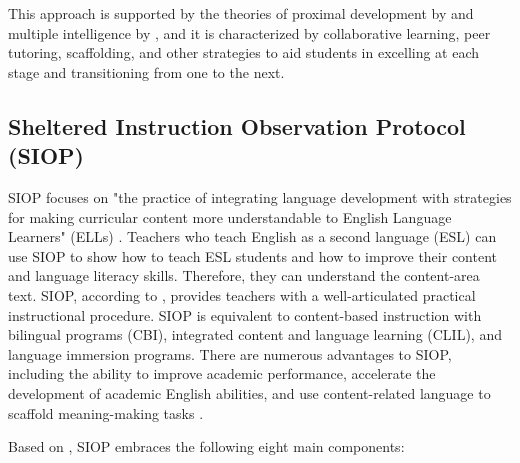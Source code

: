 \documentclass[english]{textolivre}
\begin{document}
This approach is supported by the theories of proximal development by \textcite{vygotskii_mind_1978} and multiple intelligence by \textcite{gardner_educational_1989}, and it is characterized by collaborative learning, peer tutoring, scaffolding, and other strategies to aid students in excelling at each stage and transitioning from one to the next.

\subsection{Sheltered Instruction Observation Protocol (SIOP)}\label{sec-conduta}
SIOP focuses on "the practice of integrating language development with strategies for making curricular content more understandable to English Language Learners" (ELLs) \cite[p. 334]{short_developing_2012}. Teachers who teach English as a second language (ESL) can use SIOP to show how to teach ESL students and how to improve their content and language literacy skills. Therefore, they can understand the content-area text. SIOP, according to \textcite{echevarria_using_2011}, provides teachers with a well-articulated practical instructional procedure. SIOP is equivalent to content-based instruction with bilingual programs (CBI), integrated content and language learning (CLIL), and language immersion programs. There are numerous advantages to SIOP, including the ability to improve academic performance, accelerate the development of academic English abilities, and use content-related language to scaffold meaning-making tasks \cite{murie_when_2001,song_content-based_2006}.

Based on \textcite{echevarria_making_2017}, SIOP embraces the following eight main components:
\end{document}
